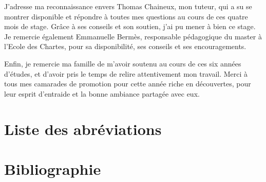 \documentclass[12pt,twoside]{book}
\begin{document}
J'adresse ma reconnaissance envers Thomas Chaineux, mon tuteur, qui a su se montrer disponible et répondre à toutes mes questions au cours de ces quatre mois de stage. Grâce à ses conseils et son soutien, j'ai pu mener à bien ce stage. Je remercie également Emmanuelle Bermès, responsable pédagogique du master à l'Ecole des Chartes, pour sa disponibilité, ses conseils et ses encouragements.

Enfin, je remercie ma famille de m'avoir soutenu au cours de ces six années d'études, et d'avoir pris le temps de relire attentivement mon travail. Merci à tous mes camarades de promotion pour cette année riche en découvertes, pour leur esprit d'entraide et la bonne ambiance partagée avec eux.
	\newpage{\pagestyle{empty}\cleardoublepage}
	
\chapter{Liste des abréviations}
\printacronyms[heading=none]


\chapter*{Bibliographie}
\nocite{*}

\printbibliography[heading=subbibliography, keyword={themeCujas}, title={Fonds patrimoniaux et histoire de la bibliothèque Cujas}]
\printbibliography[heading=subbibliography, keyword={themeNumerisation}, title={Numérisation et valorisation du patrimoine écrit}]
\printbibliography[heading=subbibliography, keyword={themeDonnees}, title={Données, métadonnées et systèmes d'information}]
\printbibliography[heading=subbibliography, keyword={themeMethodo}, title={Méthodologie et réflexions professionnelles}]




\newpage{\pagestyle{empty}\cleardoublepage}
\end{document}

